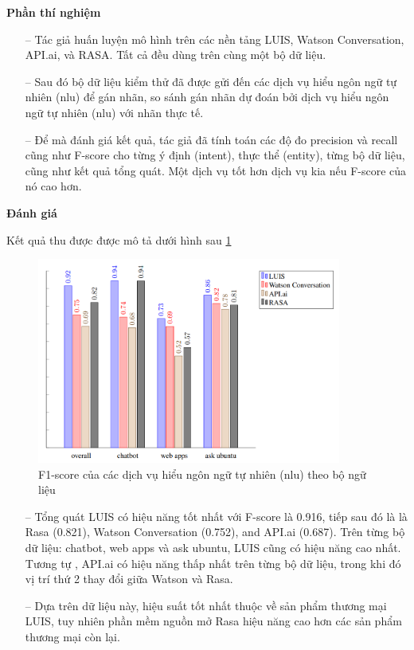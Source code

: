 \textbf{Phần thí nghiệm}

\begin{itemize}
    \item[--] Tác giả huấn luyện mô hình trên các nền tảng LUIS, Watson Conversation, API.ai, và RASA. Tất cả đều dùng trên cùng một bộ dữ liệu.
        \item[--]Sau đó bộ dữ liệu kiểm thử đã được gửi đến các dịch vụ hiểu ngôn ngữ tự nhiên (\ac{nlu}) để gán nhãn, so sánh gán nhãn dự đoán bởi dịch vụ hiểu ngôn ngữ tự nhiên (\ac{nlu}) với nhãn thực tế.
        \item[--]Để mà đánh giá kết quả, tác giả đã tính toán các độ đo precision và recall cũng như F-score cho từng ý định (intent), thực thể (entity), từng bộ dữ liệu, cũng như kết quả tổng quát. Một dịch vụ tốt hơn dịch vụ kia nếu F-score của nó cao hơn.
\end{itemize}

\textbf{Đánh giá}

Kết quả thu được được mô tả dưới hình sau \ref{fig:comparisonimg-FscoresNLUServices}

\begin{figure}[H]
    \centering
    \includegraphics[width=10cm]{images/comparisonimg/FscoresNLUServices.png}
    \caption{F1-score của các dịch vụ hiểu ngôn ngữ tự nhiên (\ac{nlu}) theo bộ ngữ liệu}
    \label{fig:comparisonimg-FscoresNLUServices}
\end{figure}

\begin{itemize}
    \item[--] Tổng quát LUIS có hiệu năng tốt nhất với F-score là 0.916, tiếp sau đó là là Rasa (0.821), Watson Conversation (0.752), and API.ai (0.687). Trên từng bộ dữ liệu: chatbot, web apps và ask ubuntu, LUIS cũng có hiệu năng cao nhất. Tương tự , API.ai có hiệu năng thấp nhất trên từng bộ dữ liệu, trong khi đó vị trí thứ 2 thay đổi giữa Watson và Rasa.
    \item[--] Dựa trên dữ liệu này, hiệu suất tốt nhất thuộc về sản phẩm thương mại LUIS, tuy nhiên phần mềm nguồn mở Rasa hiệu năng cao hơn các sản phẩm thương mại còn lại.
\end{itemize}

